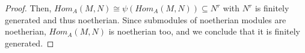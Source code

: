 \begin{problem}
\begin{enumerate}[label=(\theproblem.\arabic*),ref=\theproblem.\arabic*]
\begin{sol}
\begin{proof}
                    Then, $Hom_A(M,N) \cong \psi(Hom_A(M,N)) \subseteq N^r$ with $N^r$ is finitely generated and thus noetherian.
                    Since submodules of noetherian modules are noetherian, $Hom_A(M,N)$ is noetherian too, and we conclude that it is finitely generated.
                \end{proof}
            \end{sol}
    \end{enumerate}
\end{problem}